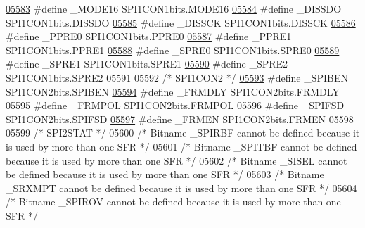 \begin{DoxyCode}
\hypertarget{a00015_source_l05583}{}\hyperlink{a00015_a4d23f23f2aa0445026181db6ac4f2fc7}{05583} \textcolor{preprocessor}{#define \_MODE16 SPI1CON1bits.MODE16}
\hypertarget{a00015_source_l05584}{}\hyperlink{a00015_a8e70c1ec6c628abccd7efaf0a5a68163}{05584} \textcolor{preprocessor}{#define \_DISSDO SPI1CON1bits.DISSDO}
\hypertarget{a00015_source_l05585}{}\hyperlink{a00015_a6b68bc451b7f5aa78e5991af22fc39a0}{05585} \textcolor{preprocessor}{#define \_DISSCK SPI1CON1bits.DISSCK}
\hypertarget{a00015_source_l05586}{}\hyperlink{a00015_a634e7188bd7a9d19f7a896b8c2220136}{05586} \textcolor{preprocessor}{#define \_PPRE0 SPI1CON1bits.PPRE0}
\hypertarget{a00015_source_l05587}{}\hyperlink{a00015_a961057d8de29befd974b2d51240d34b7}{05587} \textcolor{preprocessor}{#define \_PPRE1 SPI1CON1bits.PPRE1}
\hypertarget{a00015_source_l05588}{}\hyperlink{a00015_ae64427bd69b9407d26ca88b4879202fd}{05588} \textcolor{preprocessor}{#define \_SPRE0 SPI1CON1bits.SPRE0}
\hypertarget{a00015_source_l05589}{}\hyperlink{a00015_ac5abdcba1b5bb90bdd2ec147b48a40db}{05589} \textcolor{preprocessor}{#define \_SPRE1 SPI1CON1bits.SPRE1}
\hypertarget{a00015_source_l05590}{}\hyperlink{a00015_a421cd354293bbade98515ca05599a152}{05590} \textcolor{preprocessor}{#define \_SPRE2 SPI1CON1bits.SPRE2}
05591 
05592 \textcolor{comment}{/* SPI1CON2 */}
\hypertarget{a00015_source_l05593}{}\hyperlink{a00015_a92d53bd4032c4f2912aeb9dcd1cb130a}{05593} \textcolor{preprocessor}{#define \_SPIBEN SPI1CON2bits.SPIBEN}
\hypertarget{a00015_source_l05594}{}\hyperlink{a00015_ab36d378c8fc408680ba52c9a29a0102a}{05594} \textcolor{preprocessor}{#define \_FRMDLY SPI1CON2bits.FRMDLY}
\hypertarget{a00015_source_l05595}{}\hyperlink{a00015_ac9de9fc6ebf551217feb55552503c659}{05595} \textcolor{preprocessor}{#define \_FRMPOL SPI1CON2bits.FRMPOL}
\hypertarget{a00015_source_l05596}{}\hyperlink{a00015_ad2e48ee24cf208254edfbddfcc85b47a}{05596} \textcolor{preprocessor}{#define \_SPIFSD SPI1CON2bits.SPIFSD}
\hypertarget{a00015_source_l05597}{}\hyperlink{a00015_a37a0230c3be9e4f9274e2ff908dc0684}{05597} \textcolor{preprocessor}{#define \_FRMEN SPI1CON2bits.FRMEN}
05598 
05599 \textcolor{comment}{/* SPI2STAT */}
05600 \textcolor{comment}{/* Bitname \_SPIRBF cannot be defined because it is used by more than one SFR */}
05601 \textcolor{comment}{/* Bitname \_SPITBF cannot be defined because it is used by more than one SFR */}
05602 \textcolor{comment}{/* Bitname \_SISEL cannot be defined because it is used by more than one SFR */}
05603 \textcolor{comment}{/* Bitname \_SRXMPT cannot be defined because it is used by more than one SFR */}
05604 \textcolor{comment}{/* Bitname \_SPIROV cannot be defined because it is used by more than one SFR */}

\end{DoxyCode}
